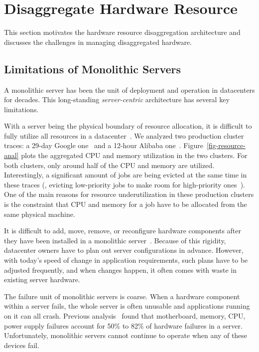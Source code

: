 


\section{Disaggregate Hardware Resource}
\label{sec:lego:motivation}

This section
motivates the hardware resource disaggregation architecture
and discusses the challenges in managing disaggregated hardware.

\subsection{Limitations of Monolithic Servers}
\label{sec:lego:monolimit}
A monolithic server has been the unit of deployment and operation in datacenters for decades.
This long-standing {\em server-centric} architecture has several key limitations.

With a server being the physical boundary of resource allocation, 
it is difficult to fully utilize all resources in a datacenter~\cite{Barroso-COMPUTER,Quasar-ASPLOS,PowerNap}.
We analyzed two production cluster traces: a 29-day Google one~\cite{GoogleTrace}
and a 12-hour Alibaba one~\cite{AliTrace}.
Figure~\ref{fig-resource-anal} plots the aggregated CPU and memory utilization in the two clusters.
For both clusters, only around half of the CPU and memory are utilized.
Interestingly,
a significant amount of jobs are being evicted at the same time in these traces
(\eg, evicting low-priority jobs to make room for high-priority ones~\cite{Borg}). %
One of the main reasons for resource underutilization in these production clusters is 
the constraint that CPU and memory for a job have to be allocated from 
the same physical machine.

It is difficult to add, move, remove, or reconfigure hardware components
after they have been installed in a monolithic server~\cite{FB-Wedge100}. %
Because of this rigidity, datacenter owners have to plan out server configurations in advance.
However, with today's speed of change in application requirements, such plans have to be adjusted frequently,
and when changes happen, it often comes with waste in existing server hardware.

The failure unit of monolithic servers is coarse.
When a hardware component within a server fails, %
the whole server is often unusable and applications running on it can all crash.
Previous analysis~\cite{Failure-Disk-FAST07} found that motherboard, memory, CPU, power supply failures account for 
50\% to 82\% of hardware failures in a server.
Unfortunately, monolithic servers cannot continue to operate when any of these devices fail.

